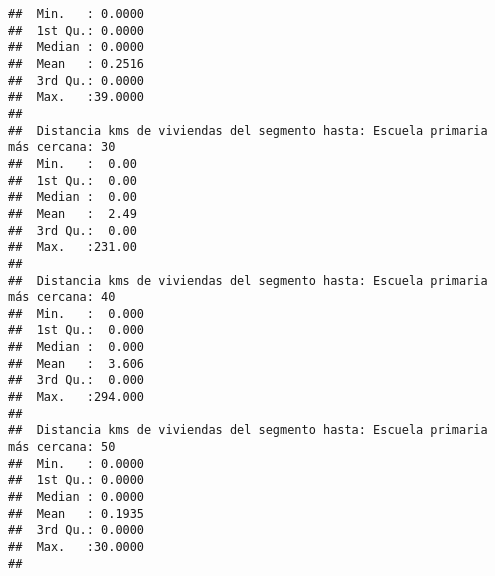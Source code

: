 \documentclass[11pt,]{article}
\begin{document}
\begin{verbatim}
##  Min.   : 0.0000                                                                
##  1st Qu.: 0.0000                                                                
##  Median : 0.0000                                                                
##  Mean   : 0.2516                                                                
##  3rd Qu.: 0.0000                                                                
##  Max.   :39.0000                                                                
##                                                                                 
##  Distancia kms de viviendas del segmento hasta: Escuela primaria más cercana: 30
##  Min.   :  0.00                                                                 
##  1st Qu.:  0.00                                                                 
##  Median :  0.00                                                                 
##  Mean   :  2.49                                                                 
##  3rd Qu.:  0.00                                                                 
##  Max.   :231.00                                                                 
##                                                                                 
##  Distancia kms de viviendas del segmento hasta: Escuela primaria más cercana: 40
##  Min.   :  0.000                                                                
##  1st Qu.:  0.000                                                                
##  Median :  0.000                                                                
##  Mean   :  3.606                                                                
##  3rd Qu.:  0.000                                                                
##  Max.   :294.000                                                                
##                                                                                 
##  Distancia kms de viviendas del segmento hasta: Escuela primaria más cercana: 50
##  Min.   : 0.0000                                                                
##  1st Qu.: 0.0000                                                                
##  Median : 0.0000                                                                
##  Mean   : 0.1935                                                                
##  3rd Qu.: 0.0000                                                                
##  Max.   :30.0000                                                                
##                                                                                 

\end{verbatim}
\end{document}
